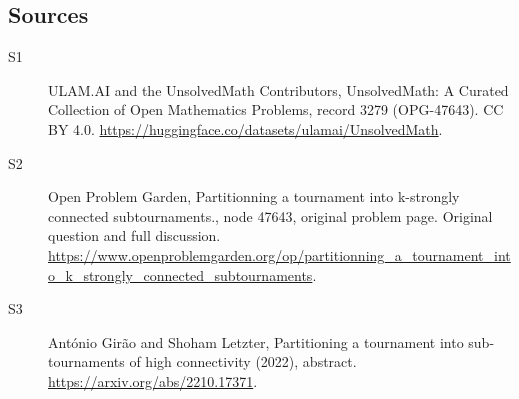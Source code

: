 \documentclass[11pt]{article}
\begin{document}
\subsection{Sources}
\begin{description}
\item[\hypertarget{source:3279:1}{S1}] ULAM.AI and the UnsolvedMath Contributors, UnsolvedMath: A Curated Collection of Open Mathematics Problems, record 3279 (OPG-47643). CC BY 4.0. \url{https://huggingface.co/datasets/ulamai/UnsolvedMath}.
\item[\hypertarget{source:3279:2}{S2}] Open Problem Garden, Partitionning a tournament into k-strongly connected subtournaments., node 47643, original problem page. Original question and full discussion. \url{https://www.openproblemgarden.org/op/partitionning_a_tournament_into_k_strongly_connected_subtournaments}.
\item[\hypertarget{source:3279:3}{S3}] António Girão and Shoham Letzter, Partitioning a tournament into sub-tournaments of high connectivity (2022), abstract. \url{https://arxiv.org/abs/2210.17371}.
\end{description}
\label{end:3279}
\end{document}
